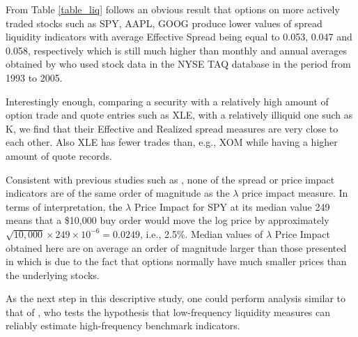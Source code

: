 \documentclass[a4paper,12pt]{article}
\theoremstyle{plain}
\theoremstyle{definition}
\begin{document}
From Table \ref{table_liq} follows an obvious result that options on more actively traded stocks such as SPY, AAPL, GOOG produce lower values of spread liquidity indicators with average Effective Spread being equal to 0.053, 0.047 and 0.058, respectively which is still much higher than monthly and annual averages obtained by \citet{goyenko_et_al} who used stock data in the NYSE TAQ database in the period from 1993 to 2005.

Interestingly enough, comparing a security with a relatively high amount of option trade and quote entries such as XLE, with a relatively illiquid one such as K, we find that their Effective and Realized spread measures are very close to each other. Also XLE has fewer trades than, e.g., XOM while having a higher amount of quote records.

Consistent with previous studies such as \citet{goyenko_et_al}, none of the spread or price impact indicators are of the same order of magnitude as the $\lambda$ price impact measure. In terms of interpretation, the $\lambda$ Price Impact for SPY at its median value 249 means that a \$10,000 buy order would move the log price by approximately $\sqrt{10,000} \times 249 \times 10^{-6} = 0.0249$, i.e., 2.5\%. Median values of $\lambda$ Price Impact obtained here are on average an order of magnitude larger than those presented in  \citet{goyenko_et_al} which is due to the fact that options normally have much smaller prices than the underlying stocks. 

As the next step in this descriptive study, one could perform analysis similar to that of  \citet{goyenko_et_al}, who tests the hypothesis that low-frequency liquidity measures can reliably estimate high-frequency benchmark indicators. 

\newpage
\end{document}
